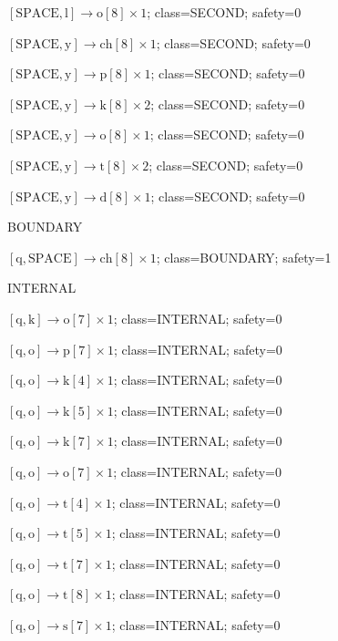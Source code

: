 \(\left[\mathrm{SPACE}, \mathrm{l}\right] \to \mathrm{o}[8] \times 1\); class=SECOND; safety=0\par
\(\left[\mathrm{SPACE}, \mathrm{y}\right] \to \mathrm{ch}[8] \times 1\); class=SECOND; safety=0\par
\(\left[\mathrm{SPACE}, \mathrm{y}\right] \to \mathrm{p}[8] \times 1\); class=SECOND; safety=0\par
\(\left[\mathrm{SPACE}, \mathrm{y}\right] \to \mathrm{k}[8] \times 2\); class=SECOND; safety=0\par
\(\left[\mathrm{SPACE}, \mathrm{y}\right] \to \mathrm{o}[8] \times 1\); class=SECOND; safety=0\par
\(\left[\mathrm{SPACE}, \mathrm{y}\right] \to \mathrm{t}[8] \times 2\); class=SECOND; safety=0\par
\(\left[\mathrm{SPACE}, \mathrm{y}\right] \to \mathrm{d}[8] \times 1\); class=SECOND; safety=0\par
BOUNDARY\par
\(\left[\mathrm{q}, \mathrm{SPACE}\right] \to \mathrm{ch}[8] \times 1\); class=BOUNDARY; safety=1\par
INTERNAL\par
\(\left[\mathrm{q}, \mathrm{k}\right] \to \mathrm{o}[7] \times 1\); class=INTERNAL; safety=0\par
\(\left[\mathrm{q}, \mathrm{o}\right] \to \mathrm{p}[7] \times 1\); class=INTERNAL; safety=0\par
\(\left[\mathrm{q}, \mathrm{o}\right] \to \mathrm{k}[4] \times 1\); class=INTERNAL; safety=0\par
\(\left[\mathrm{q}, \mathrm{o}\right] \to \mathrm{k}[5] \times 1\); class=INTERNAL; safety=0\par
\(\left[\mathrm{q}, \mathrm{o}\right] \to \mathrm{k}[7] \times 1\); class=INTERNAL; safety=0\par
\(\left[\mathrm{q}, \mathrm{o}\right] \to \mathrm{o}[7] \times 1\); class=INTERNAL; safety=0\par
\(\left[\mathrm{q}, \mathrm{o}\right] \to \mathrm{t}[4] \times 1\); class=INTERNAL; safety=0\par
\(\left[\mathrm{q}, \mathrm{o}\right] \to \mathrm{t}[5] \times 1\); class=INTERNAL; safety=0\par
\(\left[\mathrm{q}, \mathrm{o}\right] \to \mathrm{t}[7] \times 1\); class=INTERNAL; safety=0\par
\(\left[\mathrm{q}, \mathrm{o}\right] \to \mathrm{t}[8] \times 1\); class=INTERNAL; safety=0\par
\(\left[\mathrm{q}, \mathrm{o}\right] \to \mathrm{s}[7] \times 1\); class=INTERNAL; safety=0\par
